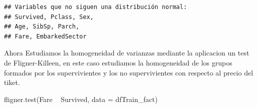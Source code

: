 \documentclass[
]{article}
\newenvironment{Shaded}{\begin{snugshade}}{\end{snugshade}}
\newcommand{\CharTok}[1]{\textcolor[rgb]{0.86,0.64,0.64}{#1}}
\newcommand{\CommentTok}[1]{\textcolor[rgb]{0.50,0.62,0.50}{#1}}
\newcommand{\ControlFlowTok}[1]{\textcolor[rgb]{0.94,0.87,0.69}{#1}}
\newcommand{\DataTypeTok}[1]{\textcolor[rgb]{0.87,0.87,0.75}{#1}}
\newcommand{\DecValTok}[1]{\textcolor[rgb]{0.86,0.86,0.80}{#1}}
\newcommand{\FloatTok}[1]{\textcolor[rgb]{0.75,0.75,0.82}{#1}}
\newcommand{\KeywordTok}[1]{\textcolor[rgb]{0.94,0.87,0.69}{#1}}
\newcommand{\NormalTok}[1]{\textcolor[rgb]{0.80,0.80,0.80}{#1}}
\newcommand{\OperatorTok}[1]{\textcolor[rgb]{0.94,0.94,0.82}{#1}}
\newcommand{\StringTok}[1]{\textcolor[rgb]{0.80,0.58,0.58}{#1}}
\begin{document}
\begin{Shaded}
\end{Shaded}

\begin{verbatim}
## Variables que no siguen una distribución normal:
## Survived, Pclass, Sex, 
## Age, SibSp, Parch, 
## Fare, EmbarkedSector
\end{verbatim}

Ahora Estudiamos la homogeneidad de varianzas mediante la aplicacion un
test de Fligner-Killeen, en este caso estudiamos la homogeneidad de los
grupos formados por los supervivientes y los no supervivientes con
respecto al precio del tiket.

\begin{Shaded}
\begin{Highlighting}[]
\KeywordTok{fligner.test}\NormalTok{(Fare }\OperatorTok{~}\StringTok{ }\NormalTok{Survived, }\DataTypeTok{data =}\NormalTok{ dfTrain_fact)}
\end{Highlighting}
\end{Shaded}
\end{document}
